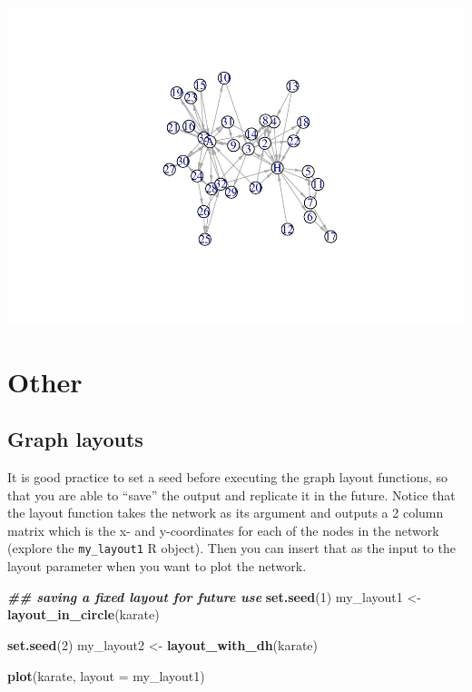 \documentclass[
]{book}
\newenvironment{Shaded}{\begin{snugshade}}{\end{snugshade}}
\newcommand{\AttributeTok}[1]{\textcolor[rgb]{0.13,0.29,0.53}{#1}}
\newcommand{\DecValTok}[1]{\textcolor[rgb]{0.00,0.00,0.81}{#1}}
\newcommand{\DocumentationTok}[1]{\textcolor[rgb]{0.56,0.35,0.01}{\textbf{\textit{#1}}}}
\newcommand{\FunctionTok}[1]{\textcolor[rgb]{0.13,0.29,0.53}{\textbf{#1}}}
\newcommand{\NormalTok}[1]{#1}
\newcommand{\OtherTok}[1]{\textcolor[rgb]{0.56,0.35,0.01}{#1}}
\begin{document}
\includegraphics{bookdown-demo_files/figure-latex/unnamed-chunk-186-1.pdf}

\section{Other}\label{other}

\subsection{Graph layouts}\label{graph-layouts}

It is good practice to set a seed before executing the graph layout functions, so that you are able to ``save'' the output and replicate it in the future. Notice that the layout function takes the network as its argument and outputs a 2 column matrix which is the x- and y-coordinates for each of the nodes in the network (explore the \texttt{my\_layout1} R object). Then you can insert that as the input to the layout parameter when you want to plot the network.

\begin{Shaded}
\begin{Highlighting}[]
\DocumentationTok{\#\# saving a fixed layout for future use }
\FunctionTok{set.seed}\NormalTok{(}\DecValTok{1}\NormalTok{)}
\NormalTok{my\_layout1 }\OtherTok{\textless{}{-}} \FunctionTok{layout\_in\_circle}\NormalTok{(karate)}

\FunctionTok{set.seed}\NormalTok{(}\DecValTok{2}\NormalTok{)}
\NormalTok{my\_layout2 }\OtherTok{\textless{}{-}} \FunctionTok{layout\_with\_dh}\NormalTok{(karate)}

\FunctionTok{plot}\NormalTok{(karate, }\AttributeTok{layout =}\NormalTok{ my\_layout1)}
\end{Highlighting}
\end{Shaded}
\end{document}
